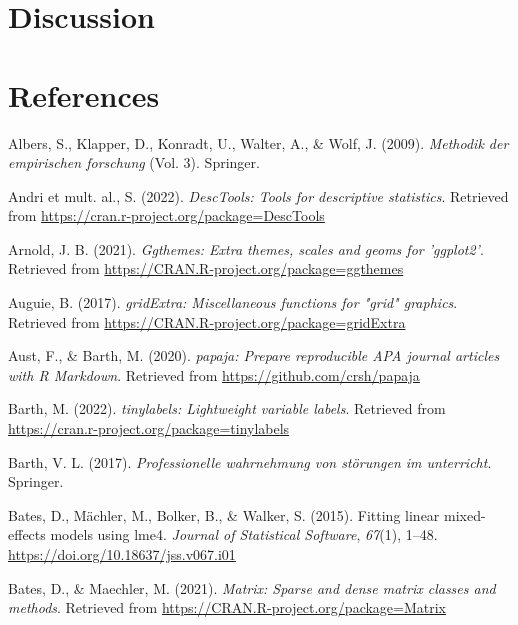 \documentclass[
  man]{apa6}
\newlength{\cslhangindent}
\newenvironment{CSLReferences}[2] %
 {\begin{list}{}{%
  \setlength{\itemindent}{0pt}
  \setlength{\leftmargin}{0pt}
  \setlength{\parsep}{0pt}
  \ifodd #1
   \setlength{\leftmargin}{\cslhangindent}
   \setlength{\itemindent}{-1\cslhangindent}
  \fi
  \setlength{\itemsep}{#2\baselineskip}}}
 {\end{list}}
\begin{document}
\section{Discussion}\label{discussion}

\newpage

\section{References}\label{references}

\begingroup
\setlength{\parindent}{-0.5in}
\setlength{\leftskip}{0.5in}

\label{refs}
\begin{CSLReferences}{1}{0}
Albers, S., Klapper, D., Konradt, U., Walter, A., \& Wolf, J. (2009). \emph{Methodik der empirischen forschung} (Vol. 3). Springer.

Andri et mult. al., S. (2022). \emph{{DescTools}: Tools for descriptive statistics}. Retrieved from \url{https://cran.r-project.org/package=DescTools}

Arnold, J. B. (2021). \emph{Ggthemes: Extra themes, scales and geoms for 'ggplot2'}. Retrieved from \url{https://CRAN.R-project.org/package=ggthemes}

Auguie, B. (2017). \emph{gridExtra: Miscellaneous functions for "grid" graphics}. Retrieved from \url{https://CRAN.R-project.org/package=gridExtra}

Aust, F., \& Barth, M. (2020). \emph{{papaja}: {Prepare} reproducible {APA} journal articles with {R Markdown}}. Retrieved from \url{https://github.com/crsh/papaja}

Barth, M. (2022). \emph{{tinylabels}: Lightweight variable labels}. Retrieved from \url{https://cran.r-project.org/package=tinylabels}

Barth, V. L. (2017). \emph{Professionelle wahrnehmung von st{ö}rungen im unterricht}. Springer.

Bates, D., Mächler, M., Bolker, B., \& Walker, S. (2015). Fitting linear mixed-effects models using {lme4}. \emph{Journal of Statistical Software}, \emph{67}(1), 1--48. \url{https://doi.org/10.18637/jss.v067.i01}

Bates, D., \& Maechler, M. (2021). \emph{Matrix: Sparse and dense matrix classes and methods}. Retrieved from \url{https://CRAN.R-project.org/package=Matrix}


\end{CSLReferences}
\end{document}
